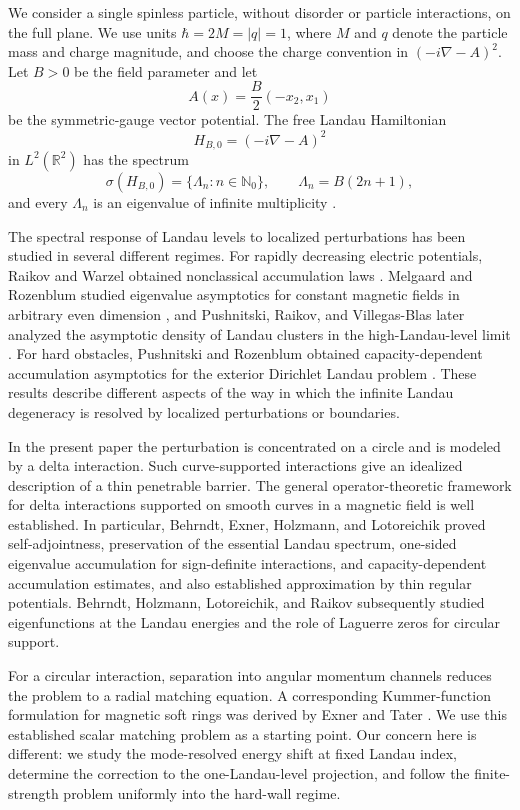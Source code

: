 \documentclass[12pt,a4paper]{article}
\numberwithin{equation}{section}
\theoremstyle{remark}
\theoremstyle{definition}
\newcommand{\R}{\mathbb R}
\newcommand{\N}{\mathbb N}
\newcommand{\spec}{\sigma}
\begin{document}
We consider a single spinless particle, without disorder or particle
interactions, on the full plane.  We use units
$\hbar=2M=|q|=1$, where $M$ and $q$ denote the particle mass and charge
magnitude, and choose the charge convention in $(-i\nabla-A)^2$.  Let
$B>0$ be the field parameter and let
$$
A(x)=\frac{B}{2}(-x_2,x_1)
$$
be the symmetric-gauge vector potential.  The free Landau Hamiltonian
$$
H_{B,0}=(-i\nabla-A)^2
$$
in $L^2(\R^2)$ has the spectrum
$$
\spec(H_{B,0})=\{\Lambda_n:n\in\N_0\},
\qquad
\Lambda_n=B(2n+1),
$$
and every $\Lambda_n$ is an eigenvalue of infinite multiplicity
\cite{LandauLifshitz}.

The spectral response of Landau levels to localized perturbations has been
studied in several different regimes.  For rapidly decreasing electric
potentials, Raikov and Warzel obtained nonclassical accumulation laws
\cite{RaikovWarzel2002}.  Melgaard and Rozenblum studied eigenvalue
asymptotics for constant magnetic fields in arbitrary even dimension
\cite{MelgaardRozenblum2003}, and Pushnitski, Raikov, and Villegas-Blas
later analyzed the asymptotic density of Landau clusters in the
high-Landau-level limit \cite{PushnitskiRaikovVillegas2013}.  For hard
obstacles, Pushnitski and Rozenblum obtained capacity-dependent
accumulation asymptotics for the exterior Dirichlet Landau problem
\cite{PushnitskiRozenblum2007}.  These results describe different aspects
of the way in which the infinite Landau degeneracy is resolved by
localized perturbations or boundaries.

In the present paper the perturbation is concentrated on a circle and is
modeled by a delta interaction.  Such curve-supported interactions give an
idealized description of a thin penetrable barrier.  The general
operator-theoretic framework for delta interactions supported on smooth
curves in a magnetic field is well established.  In particular, Behrndt,
Exner, Holzmann, and Lotoreichik \cite{BEHL2020} proved self-adjointness,
preservation of the essential Landau spectrum, one-sided eigenvalue
accumulation for sign-definite interactions, and capacity-dependent
accumulation estimates, and also established approximation by thin regular
potentials.  Behrndt, Holzmann, Lotoreichik, and Raikov
\cite{BHLR2022} subsequently studied eigenfunctions at the Landau energies
and the role of Laguerre zeros for circular support.

For a circular interaction, separation into angular momentum channels
reduces the problem to a radial matching equation.  A corresponding
Kummer-function formulation for magnetic soft rings was derived by Exner
and Tater \cite{ExnerTater2004}.  We use this established scalar matching
problem as a starting point.  Our concern here is different: we study the
mode-resolved energy shift at fixed Landau index, determine the correction
to the one-Landau-level projection, and follow the finite-strength problem
uniformly into the hard-wall regime.
\end{document}
